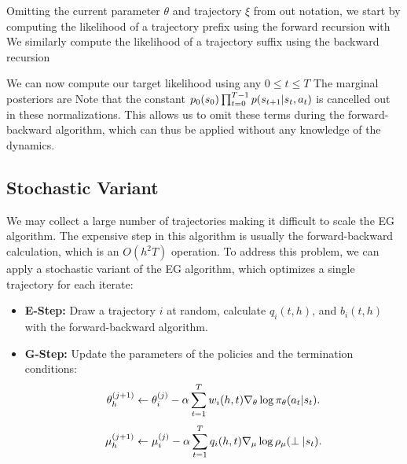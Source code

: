 Omitting the current parameter $\theta$ and trajectory $\xi$ from out notation, we start by computing the likelihood of a trajectory prefix
using the forward recursion
with
We similarly compute the likelihood of a trajectory suffix
using the backward recursion

We can now compute our target likelihood using any $0\le t\le T$
The marginal posteriors are
Note that the constant $p_0(s_0) \prod_{t=0}^{T-1} p(s_{t+1} \vert s_t, a_t)$ is cancelled out in these normalizations. This allows us to omit these terms during the forward-backward algorithm, which can thus be applied without any knowledge of the dynamics.

\subsection*{Stochastic Variant}
We may collect a large number of trajectories making it difficult to scale the EG algorithm.
The expensive step in this algorithm is usually the forward-backward calculation, which is an $O(h^2T)$ operation.
To address this problem, we can apply a stochastic variant of the EG algorithm, which optimizes a single trajectory for each iterate:
\begin{itemize}
    \item \textbf{E-Step: } Draw a trajectory $i$ at random, calculate $q_i(t,h)$, and $b_i(t,h)$ with the forward-backward algorithm.
   \item \textbf{G-Step: } Update the parameters of the policies and the termination conditions:
    \[
\theta_h^{(j+1)} \leftarrow \theta_i^{(j)} - \alpha  \sum_{t=1}^{T} w_i(h,t) \nabla_\theta \log \pi_\theta(a_t \vert s_t).
\]
\[
\mu_h^{(j+1)} \leftarrow \mu_i^{(j)} - \alpha \sum_{t=1}^{T} q_i(h,t) \nabla_\mu \log \rho_\mu(\perp \vert s_t).
\]
\end{itemize}



